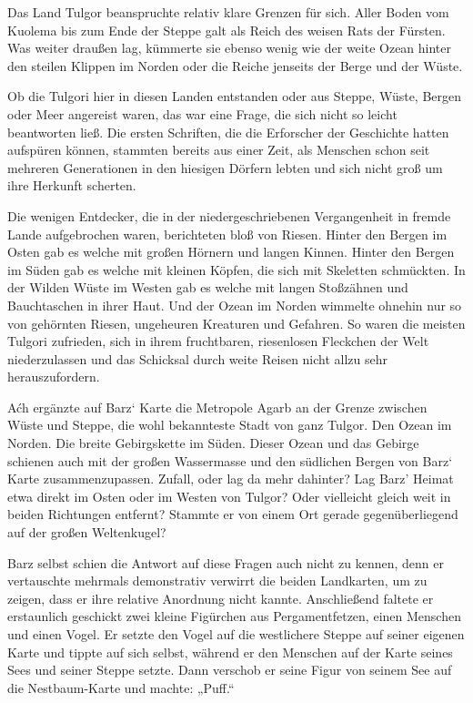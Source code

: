 Das Land Tulgor beanspruchte relativ klare Grenzen für sich. Aller Boden vom Kuolema bis zum Ende der Steppe galt als Reich des weisen Rats der Fürsten. Was weiter draußen lag, kümmerte sie ebenso wenig wie der weite Ozean hinter den steilen Klippen im Norden oder die Reiche jenseits der Berge und der Wüste.

Ob die Tulgori hier in diesen Landen entstanden oder aus Steppe, Wüste, Bergen oder Meer angereist waren, das war eine Frage, die sich nicht so leicht beantworten ließ. Die ersten Schriften, die die Erforscher der Geschichte hatten aufspüren können, stammten bereits aus einer Zeit, als Menschen schon seit mehreren Generationen in den hiesigen Dörfern lebten und sich nicht groß um ihre Herkunft scherten.

Die wenigen Entdecker, die in der niedergeschriebenen Vergangenheit in fremde Lande aufgebrochen waren, berichteten bloß von Riesen. Hinter den Bergen im Osten gab es welche mit großen Hörnern und langen Kinnen. Hinter den Bergen im Süden gab es welche mit kleinen Köpfen, die sich mit Skeletten schmückten. In der Wilden Wüste im Westen gab es welche mit langen Stoßzähnen und Bauchtaschen in ihrer Haut. Und der Ozean im Norden wimmelte ohnehin nur so von gehörnten Riesen, ungeheuren Kreaturen und Gefahren. So waren die meisten Tulgori zufrieden, sich in ihrem fruchtbaren, riesenlosen Fleckchen der Welt niederzulassen und das Schicksal durch weite Reisen nicht allzu sehr herauszufordern.

Aćh ergänzte auf Barz‘ Karte die Metropole Agarb an der Grenze zwischen Wüste und Steppe, die wohl bekannteste Stadt von ganz Tulgor. Den Ozean im Norden. Die breite Gebirgskette im Süden. Dieser Ozean und das Gebirge schienen auch mit der großen Wassermasse und den südlichen Bergen von Barz‘ Karte zusammenzupassen. Zufall, oder lag da mehr dahinter? Lag Barz’ Heimat etwa direkt im Osten oder im Westen von Tulgor? Oder vielleicht gleich weit in beiden Richtungen entfernt? Stammte er von einem Ort gerade gegenüberliegend auf der großen Weltenkugel?

Barz selbst schien die Antwort auf diese Fragen auch nicht zu kennen, denn er vertauschte mehrmals demonstrativ verwirrt die beiden Landkarten, um zu zeigen, dass er ihre relative Anordnung nicht kannte. Anschließend faltete er erstaunlich geschickt zwei kleine Figürchen aus Pergamentfetzen, einen Menschen und einen Vogel. Er setzte den Vogel auf die westlichere Steppe auf seiner eigenen Karte und tippte auf sich selbst, während er den Menschen auf der Karte seines Sees und seiner Steppe setzte. Dann verschob er seine Figur von seinem See auf die Nestbaum-Karte und machte: „Puff.“

